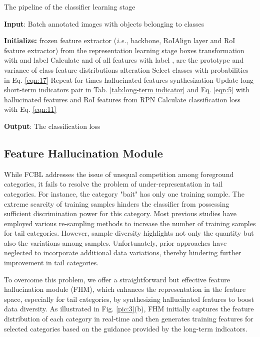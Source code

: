 \documentclass[lettersize,journal]{IEEEtran}
\begin{document}
\begin{algorithm}[t]
    \caption{The pipeline of the classifier learning stage}
    \label{alg:algorithm}
    \textbf{Input}: Batch annotated images  with  objects belonging to  classes


    \begin{algorithmic}[1] \STATE \textbf{Initialize:} frozen feature extractor  ({\em i.e.}, backbone, RoIAlign layer and RoI feature extractor) from the representation learning stage
    \STATE    boxes transformation with  and label 
    \STATE 
    \ENDFOR
    \STATE Calculate  and  of all features  with label 
    \STATE   ,  are the prototype and variance of class 
    \ENDFOR  feature distributions alteration
    \STATE Select  classes with probabilities  in Eq. \eqref{eqn:17}
    \STATE Repeat  for  times
    \ENDFOR  hallucinated features synthesization
    \STATE Update long-short-term indicators pair in Tab. \ref{tab:long-term indicator} and Eq. \eqref{eqn:5} with hallucinated features and RoI features from RPN
    \vspace{-4mm}
    \STATE Calculate classification loss with Eq. \eqref{eqn:11}
    \end{algorithmic}
    \textbf{Output}: The classification loss 
\end{algorithm}

\subsection{Feature Hallucination Module}\label{sec:3.5}

While FCBL addresses the issue of unequal competition among foreground categories, it fails to resolve the problem of under-representation in tail categories.
For instance, the category "bait" has only one training sample.
The extreme scarcity of training samples hinders the classifier from possessing sufficient discrimination power for this category.
Most previous studies have employed various re-sampling methods to increase the number of training samples for tail categories.
However, sample diversity highlights not only the quantity but also the variations among samples.
Unfortunately, prior approaches have neglected to incorporate additional data variations, thereby hindering further improvement in tail categories.


To overcome this problem, we offer a straightforward but effective feature hallucination module (FHM), which enhances the representation in the feature space, especially for tail categories, by synthesizing hallucinated features to boost data diversity.
As illustrated in Fig. \ref{pic:3}(b), FHM initially captures the feature distribution of each category in real-time and then generates training features for selected categories based on the guidance provided by the long-term indicators.
\end{document}
